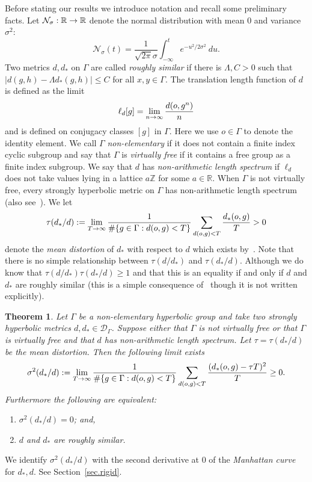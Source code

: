 \documentclass[AHL,Unicode,longabstracts,published]{cedram}
\newcommand{\G}{\Gamma}
\newcommand{\Dc}{\mathcal{D}}
\newcommand{\Nc}{\mathcal{N}}
\newcommand{\R}{\mathbb{R}}
\newcommand{\Z}{\mathbb{Z}}
\let\originalleft\left
\let\originalright\right
\renewcommand{\left}{\mathopen{}\mathclose\bgroup\originalleft}
\renewcommand{\right}{\aftergroup\egroup\originalright}
\renewcommand*{\to}{\mathchoice{\longrightarrow}{\rightarrow}{\rightarrow}{\rightarrow}}
\theoremstyle{plain}
\newtheorem{theol}{Theorem}
\newcommand{\G}{\Gamma}
\begin{document}
Before stating our results we introduce notation and recall some preliminary facts. Let $\Nc_\sigma : \R \to \R$ denote the normal distribution with mean $0$ and variance $\sigma^2$:
\[
\Nc_\sigma(t) = \frac{1}{\sqrt{2\pi}\sigma} \int_{-\infty}^t e^{-u^2/2\sigma^2} \ du.
\]
Two metrics $d,d_\ast$ on $\G$ are called \emph{roughly similar} if there is $\Lambda, C >0$ such that $|d(g,h) - \Lambda d_\ast(g,h)| \le C$ for all $x,y \in \G$. The translation length function of $d$ is defined as the limit
\[
\ell_d[g] = \lim_{n\to\infty} \frac{d(o,g^n)}{n}
\]
and is defined on conjugacy classes $[g]$ in $\G$. Here we use $o\in\G$ to denote the identity element. We call $\G$ \emph{non-elementary} if it does not contain a finite index cyclic subgroup and say that $\G$ is \emph{virtually free} if it contains a free group as a finite index subgroup. We say that $d$ has \emph{non-arithmetic length spectrum} if $\ell_d$ does not take values lying in a lattice $a \Z$ for some $a \in\R$. When $\G$ is not virtually free, every strongly hyperbolic metric on $\G$ has non-arithmetic length spectrum~\cite{GMM2018} (also see~\cite[Theorem~1.4]{cantrell}). We let
\[
\tau(d_\ast/d) := \lim_{T\to\infty} \frac{1}{\#\left\{g\in\G: d(o,g) <T\right\}} \sum_{d(o,g) < T} \frac{d_\ast(o,g)}{T} > 0
\]
denote the \emph{mean distortion} of $d_\ast$ with respect to $d$ which exists by~\cite[Theorem~1]{cantrell.tanaka.1}. Note that there is no simple relationship between $\tau(d/d_\ast)$ and $\tau(d_\ast/d)$. Although we do know that $\tau(d/d_\ast) \tau(d_\ast/d) \ge 1$ and that this is an equality if and only if $d$ and $d_\ast$ are roughly similar (this is a simple consequence of~\cite[Theorem~1.1 and Theorem~1.2]{cantrell} though it is not written explicitly).

\begin{theol}\label{thm.var}
Let $\G$ be a non-elementary hyperbolic group and take two strongly hyperbolic metrics $d,d_\ast \in \Dc_\G$. Suppose either that $\G$ is not virtually free or that $\G$ is virtually free and that $d$ has non-arithmetic length spectrum. Let $\tau = \tau(d_\ast/d)$ be the mean distortion. Then the following limit exists
\[
\sigma^2(d_\ast/d) := \lim_{T\to\infty} \frac{1}{\#\left\{g \in \G: d(o,g) < T\right\}} \sum_{d(o,g) < T} \frac{(d_\ast(o,g) - \tau T)^2}{T} \ge 0.
\]
Furthermore the following are equivalent:
\begin{enumerate}
\item\label{theo1.1.1} $\sigma^2(d_\ast/d) = 0$; and,
\item\label{theo1.1.2} $d$ and $d_\ast$ are roughly similar.
\end{enumerate}
\end{theol}
\begin{rema}
We identify $\sigma^2(d_\ast/d)$ with the second derivative at $0$ of the \emph{Manhattan curve} for $d_\ast, d$. See Section~\ref{sec.rigid}.
\end{rema}
\end{document}
